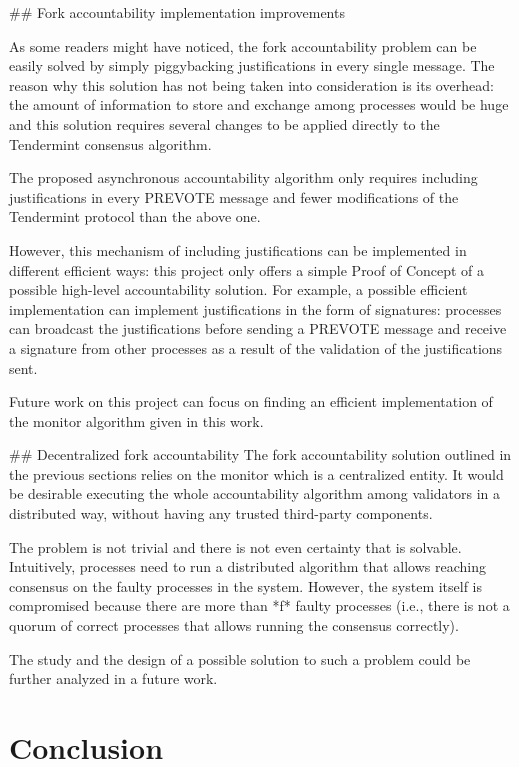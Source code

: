 \documentclass[a4paper,11pt,oneside]{report}
\begin{document}
\begin{markdown}
## Fork accountability implementation improvements

As some readers might have noticed, the fork accountability problem can be easily solved by simply piggybacking justifications in every single message.
The reason why this solution has not being taken into consideration is its overhead: the amount of information to store and exchange among processes would be huge and this solution requires several changes to be applied directly to the Tendermint consensus algorithm. 

The proposed asynchronous accountability algorithm only requires including justifications in every PREVOTE message and fewer modifications of the Tendermint protocol than the above one.

However, this mechanism of including justifications can be implemented in different efficient ways: this project only offers a simple Proof of Concept of a possible high-level accountability solution.
For example, a possible efficient implementation can implement justifications in the form of signatures: processes can broadcast the justifications before sending a PREVOTE message and receive a signature from other processes as a result of the validation of the justifications sent.

Future work on this project can focus on finding an efficient implementation of the monitor algorithm given in this work.  


## Decentralized fork accountability
The fork accountability solution outlined in the previous sections relies on the monitor which is a centralized entity. It would be desirable executing the whole accountability algorithm among validators in a distributed way, without having any trusted third-party components.

The problem is not trivial and there is not even certainty that is solvable. 
Intuitively, processes need to run a distributed algorithm that allows reaching consensus on the faulty processes in the system.
However, the system itself is compromised because there are more than *f* faulty processes (i.e., there is not a quorum of correct processes that allows running the consensus correctly).

The study and the design of a possible solution to such a problem could be further analyzed in a future work.


\end{markdown}


\chapter{Conclusion}
\end{document}
